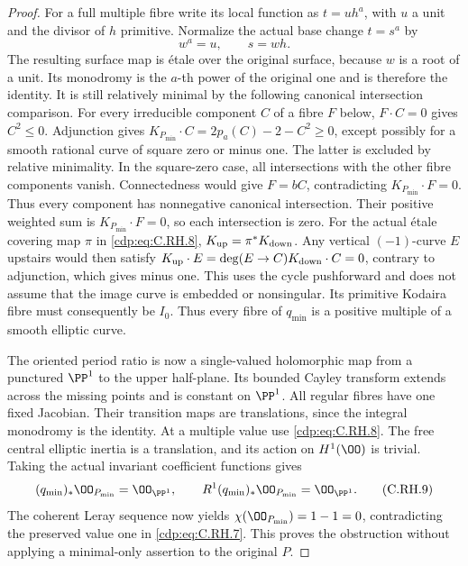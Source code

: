 \begin{proof}
For a full multiple fibre
write its local function as
\(t=u h^a\), with \(u\) a
unit and the divisor of
\(h\) primitive. Normalize
the actual base change
\(t=s^a\) by
\[
                         w^a=u,\qquad s=wh .
 \tag{C.RH.8}\label{cdp:eq:C.RH.8}
\]
The resulting surface map
is \'{e}tale over the
original surface, because
\(w\) is a root of a unit.
Its monodromy is the
\(a\)-th power of the
original one and is
therefore the identity.
It is still relatively
minimal by the following
canonical intersection
comparison. For every
irreducible component \(C\)
of a fibre \(F\) below,
\(F\cdot C=0\) gives
\(C^2\le0\). Adjunction
gives
\(K_{P_{\min}}\cdot C
=2p_a(C)-2-C^2\ge0\),
except possibly for a
smooth rational curve of
square zero or minus one.
The latter is excluded
by relative minimality.
In the square-zero case,
all intersections with
the other fibre components
vanish. Connectedness
would give \(F=bC\),
contradicting
\(K_{P_{\min}}\cdot F=0\).
Thus every component has
nonnegative canonical
intersection. Their
positive weighted sum
is \(K_{P_{\min}}\cdot F=0\),
so each intersection
is zero. For the actual
\'{e}tale covering map
\(\pi\) in \eqref{cdp:eq:C.RH.8},
\(K_{\rm up}=\pi^*K_{\rm down}\).
Any vertical \((-1)\)-curve
\(E\) upstairs would then
satisfy
\(K_{\rm up}\cdot E
=\deg(E\to C)K_{\rm down}\cdot C=0\),
contrary to adjunction,
which gives minus one.
This uses the cycle
pushforward and does
not assume that the
image curve is embedded
or nonsingular.
Its primitive Kodaira
fibre must consequently
be \(I_0\). Thus every
fibre of \(q_{\min}\)
is a positive multiple
of a smooth elliptic
curve.

The oriented period ratio
is now a single-valued
holomorphic map from a
punctured \(\PP^1\) to
the upper half-plane.
Its bounded Cayley
transform extends across
the missing points and
is constant on \(\PP^1\).
All regular fibres have
one fixed Jacobian.
Their transition maps
are translations, since
the integral monodromy
is the identity. At a
multiple value use
\eqref{cdp:eq:C.RH.8}. The free
central elliptic inertia
is a translation, and
its action on \(H^1(\OO)\)
is trivial. Taking the
actual invariant coefficient
functions gives
\[
 (q_{\min})_*\OO_{P_{\min}}=\OO_{\PP^1},
 \qquad R^1(q_{\min})_*\OO_{P_{\min}}=\OO_{\PP^1}.
 \tag{C.RH.9}\label{cdp:eq:C.RH.9}
\]
The coherent Leray
sequence now yields
\(\chi(\OO_{P_{\min}})=1-1=0\),
contradicting the preserved
value one in \eqref{cdp:eq:C.RH.7}.
This proves the obstruction
without applying a
minimal-only assertion
to the original \(P\).


\end{proof}
